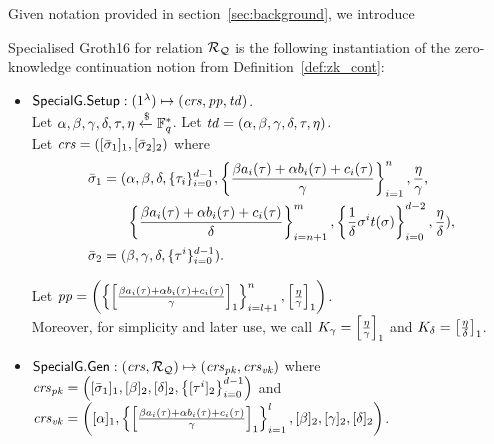 \noindent Given notation provided in section~\ref{sec:background}, we introduce

\begin{definition}
\label{insta:sg16} 
Specialised Groth16 for relation $\mathcal{R}_{\mathcal{Q}}$ is the following instantiation of the zero-knowledge continuation notion from Definition~\ref{def:zk_cont}:
\begin{itemize}
\item ${\mathsf{SpecialG}}.{\mathsf{Setup}}: (1^{\lambda}) \mapsto (\mathit{crs}, \mathit{pp}, \mathit{td})$. \\ 
\noindent Let $\alpha, \beta, \gamma, \delta, \tau, \eta  \xleftarrow{\$} \mathbb{F}_q^{*}$. Let $\mathit{td} = (\alpha, \beta, \gamma, \delta, \tau, \eta)$. \\ 
Let $\mathit{crs} = ([\bar{\sigma}_1]_1, [\bar{\sigma}_2]_2)$ where 
\begin{align*}
\bar{\sigma}_1 = (&\alpha, \beta, \delta, \{\tau_i\}_{i=0}^{d-1}, \left\{\frac{\beta a_i(\tau)+ \alpha b_i(\tau)+ c_i(\tau)}{\gamma}\right\}_{i=1}^n,  
\frac{\eta}{\gamma}, \\ 
&\left\{\frac{\beta a_i(\tau)+ \alpha b_i(\tau)+ c_i(\tau)}{\delta} \right\}_{i=n+1}^m, \left\{\frac{1}{\delta}\sigma^it(\sigma) \right\}_{i=0}^{d-2}, 
\frac{\eta}{\delta}), \\
\bar{\sigma}_2 = (&\beta, \gamma, \delta, \{\tau^i\}_{i=0}^{d-1}). 
\end{align*} 

Let $\mathit{pp} = \left( \left \{ \left[ \frac{\beta a_i(\tau)+ \alpha b_i(\tau)+ c_i(\tau)}{\gamma} \right]_1 \right \}_{i=l+1}^{n}, \left[ \frac{\eta}{\gamma} \right]_1 \right)$. \\
\noindent Moreover, for simplicity and later use, we call $K_{\gamma} = \left[\frac{\eta}{\gamma}\right]_1$  and $K_{\delta} = \left[ \frac{\eta}{\delta}\right] _1$.

\item ${\mathsf{SpecialG}}.\mathsf{Gen}: (\mathit{crs}, \mathcal{R}_{\mathcal{Q}}) \mapsto (\mathit{crs}_{\mathit{pk}}, \mathit{crs}_{\mathit{vk}})$ where \\
$\mathit{crs}_{\mathit{pk}} = \left([\bar{\sigma}_1]_1, [\beta]_2, [\delta]_2, \left\{[\tau^i]_2\right\}_{i=0}^{d-1}\right)$ and \\ 
$\mathit{crs}_{\mathit{vk}} = \left([\alpha]_1, \left\{ \left[ \frac{\beta a_i(\tau)+ \alpha b_i(\tau)+ c_i(\tau)}{\gamma} \right]_1 \right\}_{i=1}^{l}, 
[\beta]_2, [\gamma]_2, [\delta]_2\right)$.  


\end{itemize}
\end{definition}
